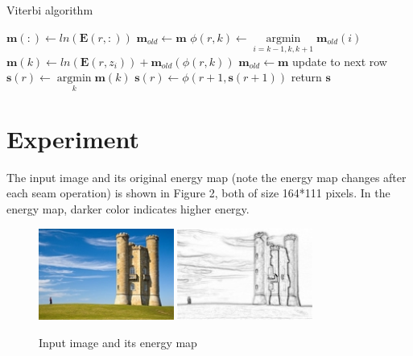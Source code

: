 \documentclass{article}
\begin{document}
	\begin{algorithm}
	    \caption{Viterbi algorithm}
	    \begin{algorithmic}[1]
		             
		            	 
		            		\State $\bm{m}(:) \gets ln(\bm{E}(r,:))$
		            		\State $\bm{m}_{old} \gets \bm{m}$
		            	\Else
		            	 
		            		\State $\phi(r,k) \gets \underset{i=k-1,k,k+1}{\operatorname{argmin}}\bm{m}_{old}(i)$
		            		\State $\bm{m}(k) \gets ln(\bm{E}(r,z_{i}))+\bm{m}_{old}(\phi(r,k))$ 
		            	\EndFor
		            	\State $\bm{m}_{old} \gets \bm{m}$ \Comment update to next row
		            	\EndIf
		            	\EndFor
		        \EndProcedure
		         
		        	 
		        		\State $\bm{s}(r) \gets \underset{k}{\operatorname{argmin}}\bm{m}(k)$
		        	\Else {}
		        		\State $\bm{s}(r) \gets \phi(r+1,\bm{s}(r+1))$
		        	\EndIf
		        \EndFor
		        \EndProcedure
		    	\State return $\bm{s}$
	        \EndFunction
	    \end{algorithmic}
	\end{algorithm}

\section*{Experiment}
	The input image and its original energy map (note the energy map changes after each seam operation) is shown in Figure 2, both of size 164*111 pixels. In the energy map, darker color indicates higher energy.

	\begin{figure}[htbp]
	\centering
	\includegraphics[height=3cm]{input_image.jpg}
	\includegraphics[height=3cm]{original_energy_map.jpg}
	\caption{Input image and its energy map}
	\end{figure}
\end{document}
